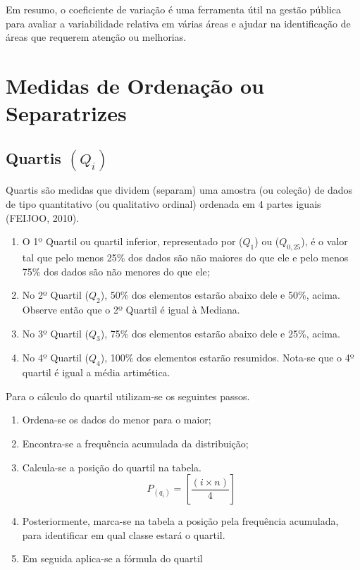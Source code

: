Em resumo, o coeficiente de variação é uma ferramenta útil na gestão pública para avaliar a variabilidade relativa em várias áreas e ajudar na identificação de áreas que requerem atenção ou melhorias.



\newpage

\section{Medidas de Ordenação ou Separatrizes}
\subsection{Quartis $(Q_{i})$}






Quartis são medidas que dividem (separam) uma amostra (ou coleção) de dados de tipo quantitativo (ou qualitativo ordinal) ordenada em 4 partes iguais (FEIJOO, 2010).



\begin{enumerate}
  \item[{1)}] O 1º Quartil ou quartil inferior, representado por ($Q_{1}$) ou ($Q_{0,25}$), é o valor tal que pelo menos 25\% dos dados são não maiores do que ele e pelo menos 75\% dos dados são não menores do que ele;


  
  \item[{2)}] No 2º Quartil ($Q_{2}$), 50\% dos elementos estarão abaixo dele e 50\%, acima. Observe então que o 2º Quartil é igual à Mediana.
  \item[{3)}] No 3º Quartil ($Q_{3}$), 75\% dos elementos estarão abaixo dele e 25\%, acima.
  \vskip0.3cm
 \item[{4)}] No 4º Quartil ($Q_{4}$), 100\% dos elementos estarão resumidos. Nota-se que o 4º quartil é igual a média artimética.
\end{enumerate}


Para o cálculo do quartil utilizam-se os seguintes passos.



\begin{enumerate}

\item [{1°)}] Ordena-se os dados do menor para o maior;
\item [{2°)}] Encontra-se a frequência acumulada da distribuição;
\item [{3°)}]Calcula-se a posição do quartil na tabela.
$$ P_{(q_{i})} = \left[ \frac{(i \times n)}{4}  \right] $$
\item [{4°)}] Posteriormente, marca-se na tabela a posição pela frequência acumulada, para identificar em qual classe estará o quartil.
\item [{5°)}] Em seguida aplica-se a fórmula do quartil
\end{enumerate}

